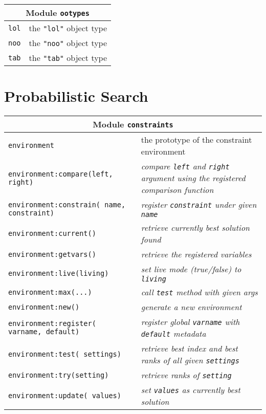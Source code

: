 \begin{appendices}
\begin{table}[H]
\begin{tabular}{|p{5cm}|p{8cm}|}
\hline
\multicolumn{2}{|c|}{Module \texttt{ootypes}}\\
\hline
\hline
\texttt{lol} & the \texttt{"lol"} object type \\
\hline
\texttt{noo} & the \texttt{"noo"} object type \\
\hline
\texttt{tab} & the \texttt{"tab"} object type \\
\hline
\end{tabular}
\end{table}


\section{Probabilistic Search}

\begin{table}[H]
\begin{tabular}{|p{5cm}|p{8cm}|}
\hline
\multicolumn{2}{|c|}{Module \texttt{constraints}}\\
\hline
\hline
\texttt{environment} & the prototype of the constraint environment \\
\hline
\texttt{environment:compare(left, right)} & \emph{compare \texttt{left} and \texttt{right} argument using the registered comparison function}\\
\hline
\texttt{environment:constrain( name, constraint)} & \emph{register \texttt{constraint} under given \texttt{name}}\\
\hline
\texttt{environment:current()} & \emph{retrieve currently best solution found}\\
\hline
\texttt{environment:getvars()} & \emph{retrieve the registered variables}\\
\hline
\texttt{environment:live(living)} & \emph{set live mode (true/false) to \texttt{living}}\\
\hline
\texttt{environment:max(...)} & \emph{call \texttt{test} method with given args}\\
\hline
\texttt{environment:new()} & \emph{generate a new environment}\\
\hline
\texttt{environment:register( varname, default)} & \emph{register global \texttt{varname} with \texttt{default} metadata}\\
\hline
\texttt{environment:test( settings)} & \emph{retrieve best index and best ranks of all given \texttt{settings}}\\
\hline
\texttt{environment:try(setting)} & \emph{retrieve ranks of \texttt{setting}}\\
\hline
\texttt{environment:update( values)} & \emph{set \texttt{values} as currently best solution}\\
\hline
\end{tabular}
\end{table}


\end{appendices}
